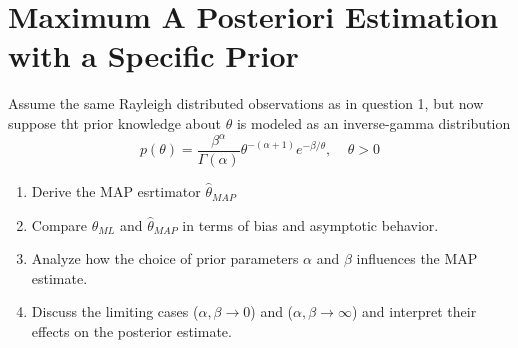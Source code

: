 \clearpage
\section{Maximum A Posteriori Estimation with a Specific Prior}
\begin{colbox}
	Assume the same Rayleigh distributed observations as in question 1, but now suppose tht prior knowledge about $\theta$ is modeled as an inverse-gamma distribution
	\begin{equation*}
		p(\theta) = \frac{\beta^\alpha}{\Gamma(\alpha)}\theta^{-(\alpha+1)}e^{-\beta/\theta}, \;\;\;\; \theta>0
	\end{equation*}
	\begin{enumerate}
		\item Derive the MAP esrtimator $\hat\theta_{MAP}$
		\item Compare $\hat\theta_{ML}$ and $\hat\theta_{MAP}$ in terms of bias and asymptotic behavior.
		\item Analyze how the choice of prior parameters $\alpha$ and $\beta$ influences the MAP estimate.
		\item Discuss the limiting cases ($\alpha,\beta \rightarrow 0$) and ($\alpha,\beta \rightarrow \infty$) and interpret their effects on the posterior estimate.
	\end{enumerate}
\end{colbox}
